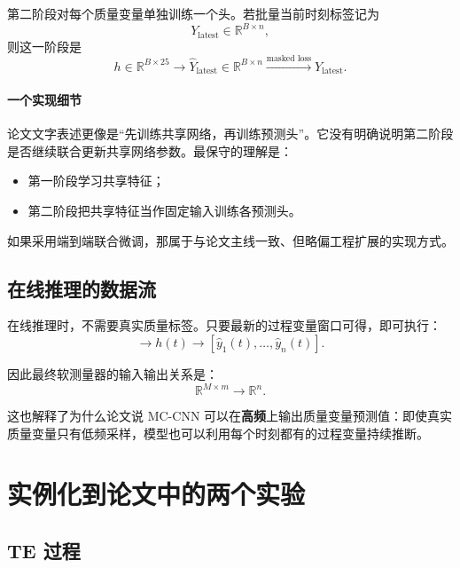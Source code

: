 \documentclass[UTF8]{ctexart}
\begin{document}
第二阶段对每个质量变量单独训练一个头。若批量当前时刻标签记为
\begin{equation}
    Y_{\text{latest}} \in \mathbb{R}^{B \times n},
\end{equation}
则这一阶段是
\begin{equation}
    h \in \mathbb{R}^{B \times 25}
    \longrightarrow
    \hat{Y}_{\text{latest}} \in \mathbb{R}^{B \times n}
    \xrightarrow{\text{masked loss}}
    Y_{\text{latest}}.
\end{equation}

\paragraph{一个实现细节}
论文文字表述更像是“先训练共享网络，再训练预测头”。它没有明确说明第二阶段是否继续联合更新共享网络参数。最保守的理解是：
\begin{itemize}
    \item 第一阶段学习共享特征；
    \item 第二阶段把共享特征当作固定输入训练各预测头。
\end{itemize}

如果采用端到端联合微调，那属于与论文主线一致、但略偏工程扩展的实现方式。

\subsection{在线推理的数据流}

在线推理时，不需要真实质量标签。只要最新的过程变量窗口可得，即可执行：
\begin{equation}
    [x_{t-M+1}, \dots, x_t]
    \longrightarrow
    h(t)
    \longrightarrow
    [\hat{y}_1(t), \dots, \hat{y}_n(t)].
\end{equation}

因此最终软测量器的输入输出关系是：
\begin{equation}
    \mathbb{R}^{M \times m} \to \mathbb{R}^{n}.
\end{equation}

这也解释了为什么论文说 MC-CNN 可以在\textbf{高频}上输出质量变量预测值：即使真实质量变量只有低频采样，模型也可以利用每个时刻都有的过程变量持续推断。

\section{实例化到论文中的两个实验}

\subsection{TE 过程}
\end{document}
